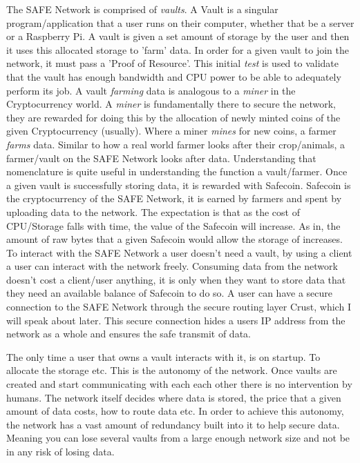 \documentclass{l4proj}
\begin{document}
The SAFE Network is comprised of \textit{vaults}. A Vault is a singular program/application that a user runs on their computer, whether that be a server or a Raspberry Pi. A vault is given a set amount of storage by the user and then it uses this allocated storage to 'farm' data. In order for a given vault to join the network, it must pass a 'Proof of Resource'. This initial \textit{test} is used to validate that the vault has enough bandwidth and CPU power to be able to adequately perform its job. A vault \textit{farming} data is analogous to a \textit{miner} in the Cryptocurrency world. A \textit{miner} is fundamentally there to secure the network, they are rewarded for doing this by the allocation of newly minted coins of the given Cryptocurrency (usually). Where a miner \textit{mines} for new coins, a farmer \textit{farms} data. Similar to how a real world farmer looks after their crop/animals, a farmer/vault on the SAFE Network looks after data. Understanding that nomenclature is quite useful in understanding the function a vault/farmer. Once a given vault is successfully storing data, it is rewarded with Safecoin. Safecoin is the cryptocurrency of the SAFE Network, it is earned by farmers and spent by uploading data to the network. The expectation is that as the cost of CPU/Storage falls with time, the value of the Safecoin will increase. As in, the amount of raw bytes that a given Safecoin would allow the storage of increases. To interact with the SAFE Network a user doesn't need a vault, by using a client a user can interact with the network freely. Consuming data from the network doesn't cost a client/user anything, it is only when they want to store data that they need an available balance of Safecoin to do so. A user can have a secure connection to the SAFE Network through the secure routing layer Crust, which I will speak about later. This secure connection hides a users IP address from the network as a whole and ensures the safe transmit of data.

The only time a user that owns a vault interacts with it, is on startup. To allocate the storage etc. This is the autonomy of the network. Once vaults are created and start communicating with each each other there is no intervention by humans. The network itself decides where data is stored, the price that a given amount of data costs, how to route data etc. In order to achieve this autonomy, the network has a vast amount of redundancy built into it to help secure data. Meaning you can lose several vaults from a large enough network size and not be in any risk of losing data.
\end{document}
